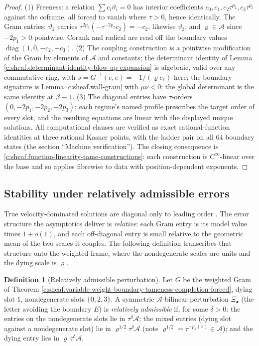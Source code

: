 \documentclass[11pt]{article}
\theoremstyle{definition}
\newtheorem{definition}[theorem]{Definition}
\theoremstyle{plain}
\begin{document}
\begin{proof}
(1) Freeness: a relation $\sum c_i\vartheta_i = 0$ has interior coefficients $c_0, c_1, c_2\tau^{p_2}, c_3\tau^{p_3}$ against the coframe, all forced to vanish where $\tau > 0$, hence identically. The Gram entries: $\vartheta_2$ carries $\tau^{2p_2}(-\tau^{-2p_2}c_2) = -c_2$, likewise $\vartheta_3$; and $\varrho \in \mathcal{A}$ since $-2p_1 > 0$ pointwise. Corank and radical are read off the boundary values $\operatorname{diag}(1, 0, -c_2, -c_3)$. (2) The coupling construction is a pointwise modification of the Gram by elements of $\mathcal{A}$ and constants; the determinant identity of Lemma \ref{c:sheaf.determinant-identity-blow-up-expansion} is algebraic, valid over any commutative ring, with $s = G^{-1}(e,e) = -1/(\varrho c_1)$ here; the boundary signature is Lemma \ref{c:sheaf.wall-gram} with $\mu\nu < 0$; the global determinant is the same identity at $\beta \equiv 1$. (3) The diagonal entries have $\tau$-orders $(0, -2p_1, -2p_2, -2p_3)$; each regime's named profile prescribes the target order of every slot, and the resulting equations are linear with the displayed unique solutions. All computational clauses are verified as exact rational-function identities at three rational Kasner points, with the ladder pair on all $64$ boundary states (the section ``Machine verification''). The closing consequence is \ref{c:sheaf.function-linearity-tame-constructions}: each construction is $C^\infty$-linear over the base and so applies fibrewise to data with position-dependent exponents.

\end{proof}

\subsection*{Stability under relatively admissible errors}
\label{c:note.sheaf.setting-stability-under-relatively-admissible-errors}
True velocity-dominated solutions are diagonal only to leading order \cite{IsenbergMoncrief1990}. The error structure the asymptotics deliver is \emph{relative}: each Gram entry is its model value times $1 + o(1)$, and each off-diagonal entry is small relative to the geometric mean of the two scales it couples. The following definition transcribes that structure onto the weighted frame, where the nondegenerate scales are units and the dying scale is $\varrho$.

\begin{definition}[Relatively admissible perturbation]\label{c:obj.sheaf.relatively-admissible-perturbation}
Let $G$ be the weighted Gram of Theorem \ref{c:sheaf.variable-weight-boundary-tameness-completion-forced}, dying slot $1$, nondegenerate slots $\{0,2,3\}$. A symmetric $\mathcal{A}$-bilinear perturbation $\Xi_\bullet$ (the letter avoiding the boundary $E$) is \emph{relatively admissible} if, for some $\delta > 0$: the entries on the nondegenerate slots lie in $\tau^\delta\mathcal{A}$; the mixed entries (dying slot against a nondegenerate slot) lie in $\varrho^{1/2}\tau^\delta\mathcal{A}$ (note $\varrho^{1/2} = \tau^{-p_1(x)} \in \mathcal{A}$); and the dying entry lies in $\varrho\,\tau^\delta\mathcal{A}$.
\end{definition}
\end{document}
